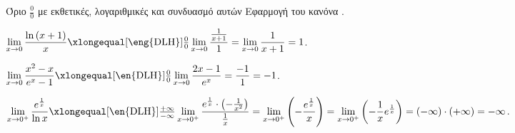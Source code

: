 \begin{askhsh}{Όριο $ \frac{0}{0} $ με εκθετικές, λογαριθμικές και συνδυασμό αυτών}
Εφαρμογή του κανόνα .
\end{askhsh}
\lysh\vspace{-7mm}
\begin{alist}
\item $\lim\limits_{x\to 0}{\dfrac{\ln{(x+1)}}{x}}\xlongequal[\text{\eng{DLH}}]{\frac{0}{0}}\lim\limits_{x\to 0}{\dfrac{\frac{1}{x+1}}{1}}=\lim\limits_{x\to0}{\dfrac{1}{x+1}}=1$.
\item $\lim\limits_{x\to 0}{\dfrac{x^2-x}{e^x-1}}\xlongequal[\text{\en{DLH}}]{\frac{0}{0}}\lim\limits_{x\to 0}{\dfrac{2x-1}{e^x}}=\dfrac{-1}{1}=-1$.
\item $\lim\limits_{x\to 0^+}{\dfrac{e^{\frac{1}{x}}}{\ln{x}}}\xlongequal[\text{\en{DLH}}]{\frac{+\infty}{-\infty}}\lim\limits_{x\to 0^+}{\dfrac{e^{\frac{1}{x}}\cdot\left(-\frac{1}{x^2}\right)}{\frac{1}{x}}}=\lim\limits_{x\to 0^+}{\left(-\dfrac{e^{\frac{1}{x}}}{x}\right)}=\lim\limits_{x\to0^+}{\left(-\dfrac{1}{x}e^{\frac{1}{x}}\right)}=(-\infty)\cdot(+\infty)=-\infty$.
\end{alist}
